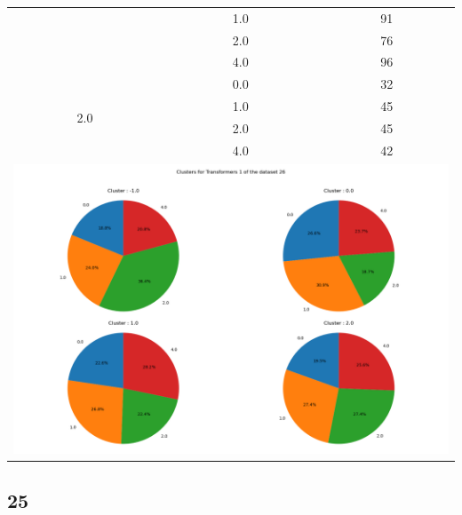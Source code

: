 \begin{longtable}{|c|c|c|c|c|}
& \multicolumn{2}{c|}{1.0} & \multicolumn{2}{c|}{91} \\
& \multicolumn{2}{c|}{2.0} & \multicolumn{2}{c|}{76} \\
& \multicolumn{2}{c|}{4.0} & \multicolumn{2}{c|}{96} \\
\hline
\multirow{4}{*}{2.0} & \multicolumn{2}{c|}{0.0} & \multicolumn{2}{c|}{32} \\
& \multicolumn{2}{c|}{1.0} & \multicolumn{2}{c|}{45} \\
& \multicolumn{2}{c|}{2.0} & \multicolumn{2}{c|}{45} \\
& \multicolumn{2}{c|}{4.0} & \multicolumn{2}{c|}{42} \\
\hline
\multicolumn{5}{|c|}{\includegraphics[width=0.8\linewidth]{img/annexes/26/clustering_pie_charts/Transformers 1.png}} \\
\end{longtable}


\subsection{25}

